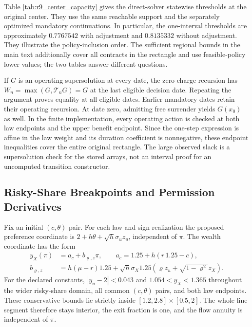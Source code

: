 
Table \ref{tab:r9_center_capacity} gives the direct-solver statewise thresholds at the original center. They use the same reachable support and the separately optimized mandatory continuations. In particular, the one-interval thresholds are approximately $0.7767542$ with adjustment and $0.8135332$ without adjustment. They illustrate the policy-inclusion order. The sufficient regional bounds in the main text additionally cover all contracts in the rectangle and use feasible-policy lower values; the two tables answer different questions.

If $G$ is an operating supersolution at every date, the zero-charge recursion has $W_n=\max(G,\mathcal T_nG)=G$ at the last eligible decision date. Repeating the argument proves equality at all eligible dates. Earlier mandatory dates retain their operating recursion. At date zero, admitting free surrender yields $G(x_0)$ as well. In the finite implementation, every operating action is checked at both law endpoints and the upper benefit endpoint. Since the one-step expression is affine in the law weight and its duration coefficient is nonnegative, these endpoint inequalities cover the entire original rectangle. The large observed slack is a supersolution check for the stored arrays, not an interval proof for an uncomputed transition constructor.

\subsection{Risky-Share Breakpoints and Permission Derivatives}
Fix an initial $(c,\theta)$ pair. For each law and sign realization the proposed preference coordinate is $2+h\theta+\sqrt h\sigma_u z_u$, independent of $\pi$. The wealth coordinate has the form
\begin{align*}
 y_X(\pi)&=a_c+b_{\varrho,z}\pi,\qquad a_c=1.25+h(r\,1.25-c),\\
 b_{\varrho,z}&=h(\mu-r)1.25+\sqrt h\sigma_X1.25
             (\varrho z_u+\sqrt{1-\varrho^2}z_X).
\end{align*}
For the declared constants, $|y_u-2|<0.043$ and $1.054<y_X<1.365$ throughout the wider risky-share domain, all common $(c,\theta)$ pairs, and both law endpoints. These conservative bounds lie strictly inside $[1.2,2.8]\times[0.5,2]$. The whole line segment therefore stays interior, the exit fraction is one, and the flow annuity is independent of $\pi$.

